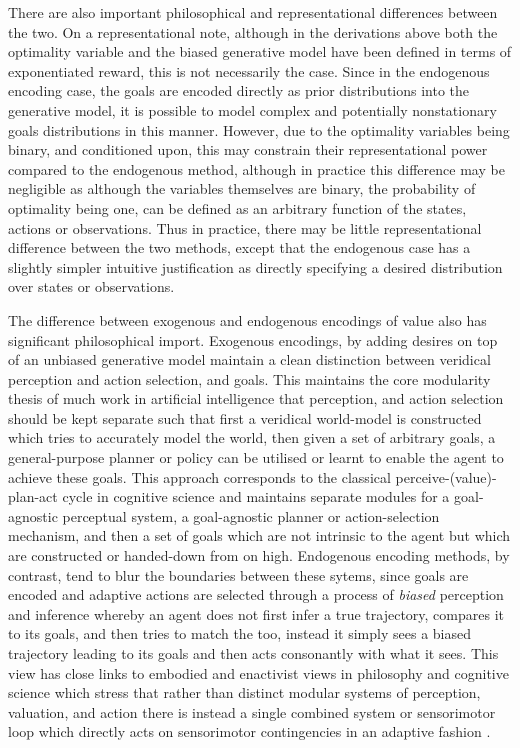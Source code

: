 There are also important philosophical and representational differences between the two. On a representational note, although in the derivations above both the optimality variable and the biased generative model have been defined in terms of exponentiated reward, this is not necessarily the case. Since in the endogenous encoding case, the goals are encoded directly as prior distributions into the generative model, it is possible to model complex and potentially nonstationary goals distributions in this manner. However, due to the optimality variables being binary, and conditioned upon, this may constrain their representational power compared to the endogenous method, although in practice this difference may be negligible as although the variables themselves are binary, the probability of optimality being one, can be defined as an arbitrary function of the states, actions or observations. Thus in practice, there may be little representational difference between the two methods, except that the endogenous case has a slightly simpler intuitive justification as directly specifying a desired distribution over states or observations.

The difference between exogenous and endogenous encodings of value also has significant philosophical import. Exogenous encodings, by adding desires on top of an unbiased generative model maintain a clean distinction between veridical perception and action selection, and goals. This maintains the core modularity thesis of much work in artificial intelligence that perception, and action selection should be kept separate such that first a veridical world-model is constructed which tries to accurately model the world, then given a set of arbitrary goals, a general-purpose planner or policy can be utilised or learnt to enable the agent to achieve these goals. This approach corresponds to the classical perceive-(value)-plan-act cycle in cognitive science and maintains separate modules for a goal-agnostic perceptual system, a goal-agnostic planner or action-selection mechanism, and then a set of goals which are not intrinsic to the agent but which are constructed or handed-down from on high. Endogenous encoding methods, by contrast, tend to blur the boundaries between these sytems, since goals are encoded and adaptive actions are selected through a process of \emph{biased} perception and inference whereby an agent does not first infer a true trajectory, compares it to its goals, and then tries to match the too, instead it simply sees a biased trajectory leading to its goals and then acts consonantly with what it sees. This view has close links to embodied and enactivist views in philosophy and cognitive science which stress that rather than distinct modular systems of perception, valuation, and action there is instead a single combined system or sensorimotor loop which directly acts on sensorimotor contingencies in an adaptive fashion \citep{baltieri2018modularity}.

